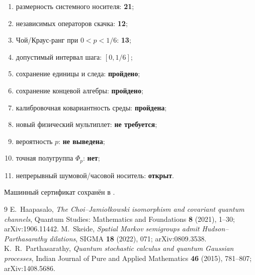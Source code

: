 \begin{protocol}
\begin{enumerate}
 \item размерность системного носителя: \textbf{21};
 \item независимых операторов скачка: \textbf{12};
 \item Чой/Краус-ранг при $0<p<1/6$: \textbf{13};
 \item допустимый интервал шага: \textbf{$[0,1/6]$};
 \item сохранение единицы и следа: \textbf{пройдено};
 \item сохранение концевой алгебры: \textbf{пройдено};
 \item калибровочная ковариантность среды: \textbf{пройдена};
 \item новый физический мультиплет: \textbf{не требуется};
 \item вероятность $p$: \textbf{не выведена};
 \item точная полугруппа $\Phi_p$: \textbf{нет};
 \item непрерывный шумовой/часовой носитель: \textbf{открыт}.
\end{enumerate}
\end{protocol}

Машинный сертификат сохранён в
.

\begin{thebibliography}{9}
E.~Haapasalo,
\emph{The Choi--Jamio\l{}kowski isomorphism and covariant quantum channels},
Quantum Studies: Mathematics and Foundations \textbf{8} (2021), 1--30;
arXiv:1906.11442.
M.~Skeide,
\emph{Spatial Markov semigroups admit Hudson--Parthasarathy dilations},
SIGMA \textbf{18} (2022), 071; arXiv:0809.3538.
K.~R.~Parthasarathy,
\emph{Quantum stochastic calculus and quantum Gaussian processes},
Indian Journal of Pure and Applied Mathematics \textbf{46} (2015),
781--807; arXiv:1408.5686.
\end{thebibliography}